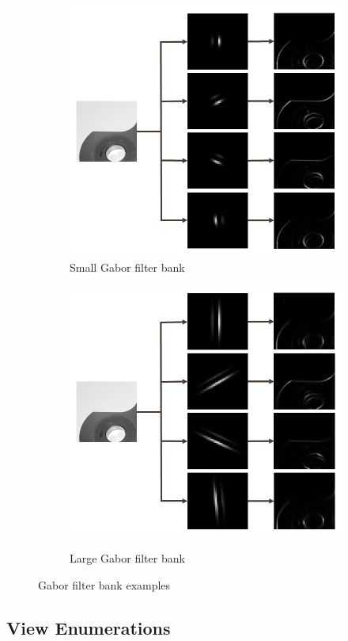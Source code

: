 \documentclass[letterpaper, 10 pt, conference]{ieeeconf}  %
\begin{document}
\begin{figure}
    \centering
    \begin{subfigure}[b]{.49\textwidth}
        \centering
        \includegraphics[width=.65\textwidth]{gabor_filter_small.png}
        \caption{Small Gabor filter bank}
        \vspace*{2mm}
        \label{fig:small gabor}
    \end{subfigure}
    \hfill
    \begin{subfigure}[b]{.49\textwidth}
        \centering
        {\includegraphics[width=.65\textwidth]{gabor_filter_large.png}}
        \caption{Large Gabor filter bank}
        \vspace*{2mm}
        \label{fig:large gabor}
    \end{subfigure}
    \caption{Gabor filter bank examples}
    \label{fig:gabor filter bank}
\end{figure}

\subsection{View Enumerations}
\end{document}
